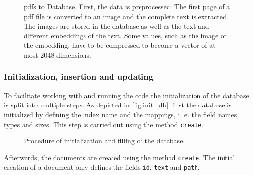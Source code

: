 \begin{figure}[!htb] %
    \centering
    
    \caption[Database procedure]{\acp{pdf} to Database. 
    First, the data is preprocessed:
    The first page of a \ac{pdf} file is converted to an image and the complete text is extracted. 
    The images are stored in the database as well as the text and different embeddings of the text.
    Some values, such as the image or the \infersent{} embedding, have to be compressed to become a vector of at most 2048 dimensions.
    }
    \label{fig:pdf2db}
\end{figure}

\subsubsection*{Initialization, insertion and updating}
To facilitate working with and running the code the initialization of the database is split into multiple steps.
As depicted in \autoref{fig:init_db}, first the database is initialized by defining the index name and the mappings, i. e. the field names, types and sizes.
This step is carried out using the method \texttt{create}.

\begin{figure}[!htb] %
    \centering
    
    \caption[Initialization and filling of the database]{Procedure of initialization and filling of the database.}
    \label{fig:init_db}
\end{figure}

Afterwards, the documents are created using the method \texttt{create}.
The initial creation of a document only defines the fields \texttt{id}, \texttt{text} and \texttt{path}.


